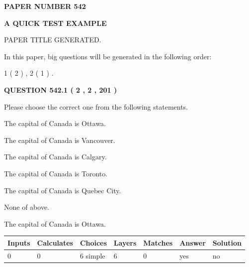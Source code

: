 \documentclass[12pt]{article}
\begin{document}
   
   
   
 {\textbf{ \Large{ PAPER NUMBER  542  }}}
   
   
\vspace{0.2in}
   
   
   
   
   
   
   
   
 \vspace{0.2in}
{\LARGE {\textbf{ A QUICK TEST EXAMPLE}}}
   
   
 PAPER TITLE GENERATED.
   
   
   
\vspace{0.2in}
   
In this paper, big questions will be generated in the following order: 
   
   
   1 ( 2 )
 ,
   2 ( 1 )
 .
  
\vspace{0.2in}
  
{\textbf{\Large{QUESTION
542.1 
 ( 2 , 2 , 201 )
}}}
  
  
Please choose the correct one from the following statements.
 
 
The capital of Canada is Ottawa.
 
 
The capital of Canada is Vancouver.
 
 
The capital of Canada is Calgary.
 
 
The capital of Canada is Toronto.
 
 
The capital of Canada is Quebec City.
 
 
 None of above.
 
 
\noindent{}
 
 
The capital of Canada is Ottawa.
 
 
\noindent{}
 
 
   
   
   
   
\noindent\begin{tabular}{|l|l|l|l|l|l|l|}
 \hline
Inputs & Calculates & Choices & Layers & Matches & Answer & Solution \\ \hline
 0  & 
 0  & 
 6
  simple  
  & 
 6  & 
 0  & 
  yes & 
  no 
  \\ \hline
 \end{tabular}
   
\end{document}
